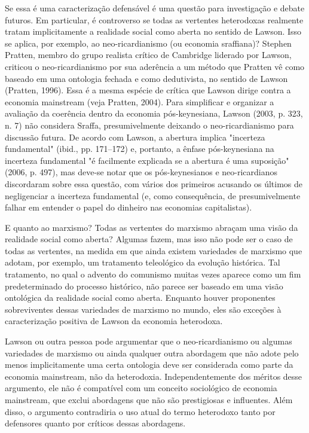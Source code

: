 \documentclass[a4paper,12pt]{article}[abntex2]
\begin{document}
Se essa é uma caracterização defensável é uma questão para investigação e debate futuros. Em particular, é controverso se todas as vertentes heterodoxas realmente tratam implicitamente a realidade social como aberta no sentido de Lawson. Isso se aplica, por exemplo, ao neo-ricardianismo (ou economia sraffiana)? Stephen Pratten, membro do grupo realista crítico de Cambridge liderado por Lawson, criticou o neo-ricardianismo por sua aderência a um método que Pratten vê como baseado em uma ontologia fechada e como dedutivista, no sentido de Lawson (Pratten, 1996). Essa é a mesma espécie de crítica que Lawson dirige contra a economia mainstream (veja Pratten, 2004). Para simplificar e organizar a avaliação da coerência dentro da economia pós-keynesiana, Lawson (2003, p. 323, n. 7) não considera Sraffa, presumivelmente deixando o neo-ricardianismo para discussão futura. De acordo com Lawson, a abertura implica "incerteza fundamental" (ibid., pp. 171–172) e, portanto, a ênfase pós-keynesiana na incerteza fundamental "é facilmente explicada se a abertura é uma suposição" (2006, p. 497), mas deve-se notar que os pós-keynesianos e neo-ricardianos discordaram sobre essa questão, com vários dos primeiros acusando os últimos de negligenciar a incerteza fundamental (e, como consequência, de presumivelmente falhar em entender o papel do dinheiro nas economias capitalistas).

E quanto ao marxismo? Todas as vertentes do marxismo abraçam uma visão da realidade social como aberta? Algumas fazem, mas isso não pode ser o caso de todas as vertentes, na medida em que ainda existem variedades de marxismo que adotam, por exemplo, um tratamento teleológico da evolução histórica. Tal tratamento, no qual o advento do comunismo muitas vezes aparece como um fim predeterminado do processo histórico, não parece ser baseado em uma visão ontológica da realidade social como aberta. Enquanto houver proponentes sobreviventes dessas variedades de marxismo no mundo, eles são exceções à caracterização positiva de Lawson da economia heterodoxa.

Lawson ou outra pessoa pode argumentar que o neo-ricardianismo ou algumas variedades de marxismo ou ainda qualquer outra abordagem que não adote pelo menos implicitamente uma certa ontologia deve ser considerada como parte da economia mainstream, não da heterodoxia. Independentemente dos méritos desse argumento, ele não é compatível com um conceito sociológico de economia mainstream, que exclui abordagens que não são prestigiosas e influentes. Além disso, o argumento contradiria o uso atual do termo heterodoxo tanto por defensores quanto por críticos dessas abordagens.
\end{document}
